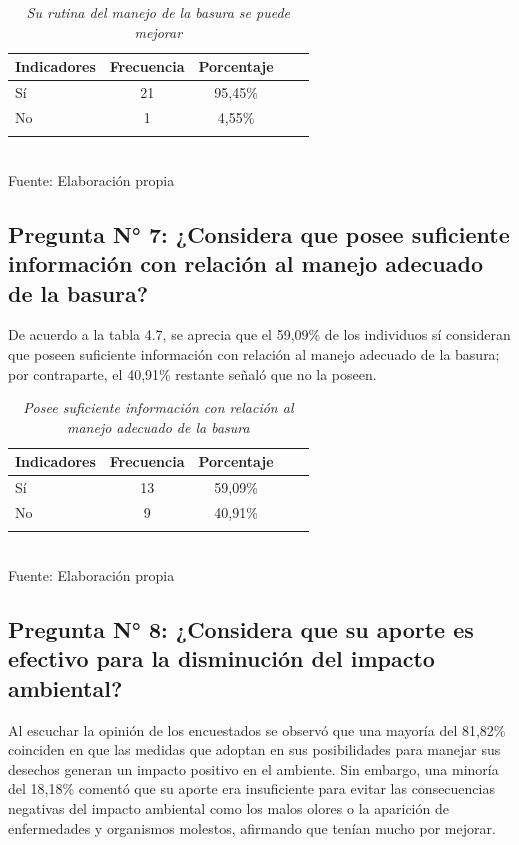 \begin{table}[h!]
    \centering
    \captionsetup{singlelinecheck=false, justification=raggedright, labelsep=newline}
    \caption{\textit{Su rutina del manejo de la basura se puede mejorar}}
    \begin{tabular}{lcccc}
        \toprule
        Indicadores & Frecuencia & Porcentaje\\
        \midrule
        Sí & 21 & 95,45\% \\
        No & 1 & 4,55\%\\
        \bottomrule\\
    \end{tabular}
    \\\RaggedRight Fuente: Elaboración propia
    \label{table:cuadro6}
\end{table}

{\setlength{\parskip}{0cm}
\subsection{Pregunta N° 7: ¿Considera que posee suficiente información con relación al manejo adecuado de la basura?}

De acuerdo a la tabla 4.7, se aprecia que el 59,09\% de los individuos sí consideran que poseen suficiente información con relación al manejo adecuado de la basura; por contraparte, el 40,91\% restante señaló que no la poseen.
}

\newpage

\begin{table}[h!]
    \centering
    \captionsetup{singlelinecheck=false, justification=raggedright, labelsep=newline}
    \caption{\textit{Posee suficiente información con relación al manejo adecuado de la basura}}
    \begin{tabular}{lcccc}
        \toprule
        Indicadores & Frecuencia & Porcentaje\\
        \midrule
        Sí & 13 & 59,09\% \\
        No & 9 & 40,91\%\\
        \bottomrule
        \\
    \end{tabular}
    \\\RaggedRight Fuente: Elaboración propia
    \label{table:cuadro7}
\end{table}

{\setlength{\parskip}{0cm}
\subsection{Pregunta N° 8: ¿Considera que su aporte es efectivo para la disminución del impacto ambiental?}

Al escuchar la opinión de los encuestados se observó que una mayoría del 81,82\% coinciden en que las medidas que adoptan en sus posibilidades para manejar sus desechos generan un impacto positivo en el ambiente. Sin embargo, una minoría del 18,18\% comentó que su aporte era insuficiente para evitar las consecuencias negativas del impacto ambiental como los malos olores o la aparición de enfermedades y organismos molestos, afirmando que tenían mucho por mejorar. 
}

